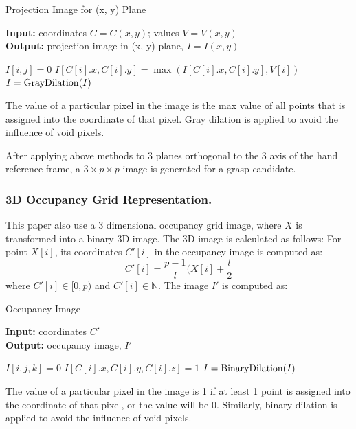 \documentclass[letterpaper]{article} %
\begin{document}
\begin{algorithm}[H]
\caption{Projection Image for (x, y) Plane}
\textbf{Input:} coordinates $C=C(x, y)$; values $V=V(x, y)$\\
\textbf{Output:} projection image in (x, y) plane, $I=I(x,y)$ \\
\begin{algorithmic}[1]
\STATE $I[i, j] = 0$
\ENDFOR
\ENDFOR
{}
\STATE $I[C[i].x, C[i].y]=\max(I[C[i].x, C[i].y], V[i])$
\ENDFOR
\STATE $I={\rm GrayDilation}(I)$
\end{algorithmic}
\end{algorithm}

The value of a particular pixel in the image is the max value of all points that is assigned into the coordinate of that pixel. Gray dilation \cite{BK1} is applied to avoid the influence of void pixels.

After applying above methods to 3 planes orthogonal to the 3 axis of the hand reference frame, a $3\times p \times p$ image is generated for a grasp candidate.

\subsubsection{3D Occupancy Grid Representation.} This paper also use a 3 dimensional occupancy grid image, where $X$ is transformed into a binary 3D image. The 3D image is calculated as follows:
For point $X[i]$, its coordinates $C'[i]$ in the occupancy image is computed as:
\begin{equation}
    C'[i]=\frac{p-1}{l} (X[i]+\frac{l}{2}
\end{equation}
where $C'[i]\in [0, p)$ and $C'[i]\in \mathbb{N}$. The image $I'$ is computed as:
\begin{algorithm}[H]
\caption{Occupancy Image}
\textbf{Input:} coordinates $C'$\\
\textbf{Output:} occupancy image, $I'$\\
\begin{algorithmic}[1]
\STATE $I[i, j, k] = 0$
\ENDFOR
\ENDFOR
\ENDFOR
{}
\STATE $I[C[i].x, C[i].y, C[i].z]=1$
\ENDFOR
\STATE $I={\rm BinaryDilation}(I)$
\end{algorithmic}
\end{algorithm}

The value of a particular pixel in the image is 1 if at least 1 point is assigned into the coordinate of that pixel, or the value will be 0. Similarly, binary dilation \cite{BK1} is applied to avoid the influence of void pixels.
\end{document}
